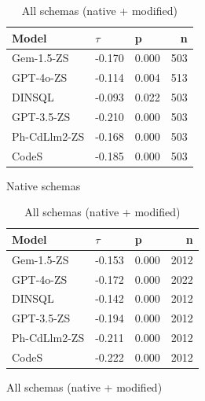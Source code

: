\begin{table}
  \centering
  \caption{Kendall-Tau ($\tau$) Correlations between \emph{Least Identifier Proportion} and \emph{Execution Accuracy}.}
  \begin{subfigure}{.5\linewidth}
      \centering
      \caption{Native schemas}
      \begin{tabular}{lllr}
\toprule
Model & $\tau$ & p & n \\
\midrule
Gem-1.5-ZS & -0.170 & 0.000 & 503 \\
GPT-4o-ZS & -0.114 & 0.004 & 513 \\
DINSQL & -0.093 & 0.022 & 503 \\
GPT-3.5-ZS & -0.210 & 0.000 & 503 \\
Ph-CdLlm2-ZS & -0.168 & 0.000 & 503 \\
CodeS & -0.185 & 0.000 & 503 \\
\bottomrule
\end{tabular}

      \label{table:natlow-manual-match-ktau-native}
  \end{subfigure}%
  \begin{subfigure}{.5\linewidth}
      \centering
      \caption{All schemas (native + modified)}
      \begin{tabular}{lllr}
\toprule
Model & $\tau$ & p & n \\
\midrule
Gem-1.5-ZS & -0.153 & 0.000 & 2012 \\
GPT-4o-ZS & -0.172 & 0.000 & 2022 \\
DINSQL & -0.142 & 0.000 & 2012 \\
GPT-3.5-ZS & -0.194 & 0.000 & 2012 \\
Ph-CdLlm2-ZS & -0.211 & 0.000 & 2012 \\
CodeS & -0.222 & 0.000 & 2012 \\
\bottomrule
\end{tabular}

      \label{table:natlow-manual-match-ktau-all}
  \end{subfigure}
\end{table}

